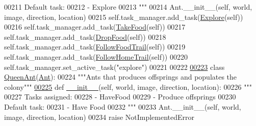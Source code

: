 \begin{DoxyCode}
00211 \textcolor{stringliteral}{        Default task:}
00212 \textcolor{stringliteral}{            - Explore}
00213 \textcolor{stringliteral}{        """}
00214         Ant.\_\_init\_\_(self, world, image, direction, location)
00215         self.task\_manager.add\_task(\hyperlink{classtask__manager_1_1Explore}{Explore}(self))
00216         self.task\_manager.add\_task(\hyperlink{classtask__manager_1_1TakeFood}{TakeFood}(self))
00217         self.task\_manager.add\_task(\hyperlink{classtask__manager_1_1DropFood}{DropFood}(self))
00218         self.task\_manager.add\_task(\hyperlink{classtask__manager_1_1FollowFoodTrail}{FollowFoodTrail}(self))
00219         self.task\_manager.add\_task(\hyperlink{classtask__manager_1_1FollowHomeTrail}{FollowHomeTrail}(self))
00220         self.task\_manager.set\_active\_task(\textcolor{stringliteral}{"explore"})
00221 
00222 
\hypertarget{ants_8py_source_l00223}{}\hyperlink{classants_1_1QueenAnt}{00223} \textcolor{keyword}{class }\hyperlink{classants_1_1QueenAnt}{QueenAnt}(\hyperlink{classants_1_1Ant}{Ant}):
00224     \textcolor{stringliteral}{"""Ants that produces offsprings and populates the colony"""}
\hypertarget{ants_8py_source_l00225}{}\hyperlink{classants_1_1QueenAnt_aea3ff8fa90122567905806f675eb9472}{00225}     \textcolor{keyword}{def }\hyperlink{classants_1_1QueenAnt_aea3ff8fa90122567905806f675eb9472}{\_\_init\_\_}(self, world, image, direction, location):
00226         \textcolor{stringliteral}{"""}
00227 \textcolor{stringliteral}{        Tasks assigned:}
00228 \textcolor{stringliteral}{            - HaveFood}
00229 \textcolor{stringliteral}{            - Produce offsprings}
00230 \textcolor{stringliteral}{        Default task:}
00231 \textcolor{stringliteral}{            - Have Food}
00232 \textcolor{stringliteral}{        """}
00233         Ant.\_\_init\_\_(self, world, image, direction, location)
00234         \textcolor{keywordflow}{raise} NotImplementedError
\end{DoxyCode}
